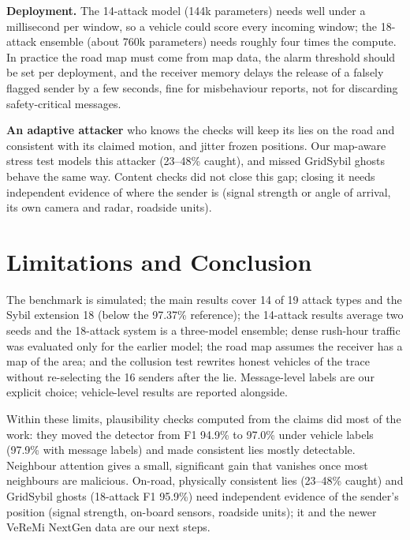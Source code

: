 \documentclass[conference]{IEEEtran}
\begin{document}
\textbf{Deployment.} The 14-attack model (144k parameters) needs well under a millisecond per window, so a vehicle could score every
incoming window; the 18-attack ensemble (about 760k parameters) needs roughly four times the compute. In practice the road map must come from map
data, the alarm threshold should be set per deployment, and the receiver memory delays the release of a falsely flagged sender by a few seconds,
fine for misbehaviour reports, not for discarding safety-critical messages.

\textbf{An adaptive attacker} who knows the checks will keep its lies on the road and consistent with its claimed motion, and jitter frozen
positions. Our map-aware stress test models this attacker (23--48\% caught), and missed GridSybil ghosts behave the same way. Content checks did
not close this gap; closing it needs independent evidence of where the sender is (signal strength or angle of arrival, its own camera and
radar, roadside units).

\section{Limitations and Conclusion}
\label{sec:conclusion}
The benchmark is simulated; the main results cover 14 of 19 attack types and the Sybil extension 18 (below the 97.37\% reference);
the 14-attack results average two seeds and the 18-attack system is a three-model ensemble; dense rush-hour traffic was
evaluated only for the earlier model; the road map assumes the receiver has a map of the area; and the collusion test rewrites honest vehicles of the
trace without re-selecting the 16 senders after the lie. Message-level labels are our explicit choice; vehicle-level results are reported alongside.

Within these limits, plausibility checks computed from the claims did most of the work: they moved the detector from F1 94.9\% to
97.0\% under vehicle labels (97.9\% with message labels) and made consistent lies mostly detectable. Neighbour attention gives a small,
significant gain that vanishes once most neighbours are malicious. On-road, physically consistent lies (23--48\% caught) and GridSybil ghosts
(18-attack F1 95.9\%) need independent evidence of the sender's position (signal strength, on-board sensors, roadside units); it and the newer VeReMi NextGen data are our next steps.
\end{document}
